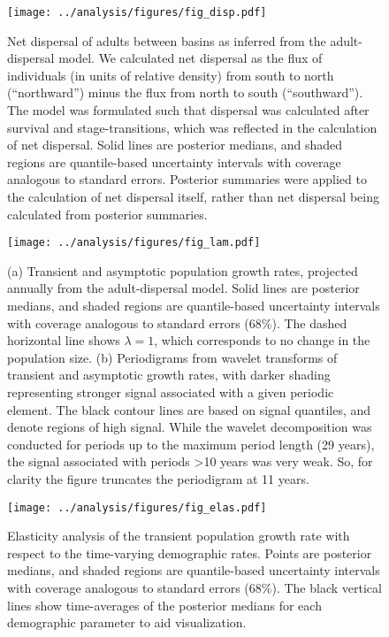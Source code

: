 \documentclass[11pt]{article}
\begin{document}
\clearpage
\begin{figure}
\centering
\texttt{[image: ../analysis/figures/fig\_disp.pdf]}
\caption{\label{fig:disp}
Net dispersal of adults between basins as inferred from the adult-dispersal model.
We calculated net dispersal as the flux of individuals (in units of relative density)
from south to north (``northward'') minus the flux from north to south (``southward'').
The model was formulated such that dispersal was calculated after survival and stage-transitions,
which was reflected in the calculation of net dispersal.
Solid lines are posterior medians,
and shaded regions are quantile-based uncertainty intervals
with coverage analogous to standard errors.
Posterior summaries were applied to the calculation of net dispersal itself,
rather than net dispersal being calculated from posterior summaries.
}
\end{figure}
\clearpage

\clearpage
\begin{figure}
\centering
\texttt{[image: ../analysis/figures/fig\_lam.pdf]}
\caption{\label{fig:lam}
(a) Transient and asymptotic population growth rates,
projected annually from the adult-dispersal model.
Solid lines are posterior medians,
and shaded regions are quantile-based uncertainty intervals
with coverage analogous to standard errors (68\%).
The dashed horizontal line shows $\lambda=1$, 
which corresponds to no change in the population size.
(b) Periodigrams from wavelet transforms of transient and asymptotic growth rates,
with darker shading representing stronger signal associated with a given periodic element.
The black contour lines are based on signal quantiles, and denote regions of high signal.
While the wavelet decomposition was conducted for periods up to the maximum period length
(29 years), the signal associated with periods >10 years was very weak. 
So, for clarity the figure truncates the periodigram at 11 years.
}
\end{figure}
\clearpage

\clearpage
\begin{figure}
\centering
\texttt{[image: ../analysis/figures/fig\_elas.pdf]}
\caption{\label{fig:elas}
Elasticity analysis of the transient population growth rate 
with respect to the time-varying demographic rates.
Points are posterior medians,
and shaded regions are quantile-based uncertainty intervals
with coverage analogous to standard errors (68\%).
The black vertical lines show time-averages of the posterior medians 
for each demographic parameter to aid visualization.
}
\end{figure}
\clearpage
\end{document}
